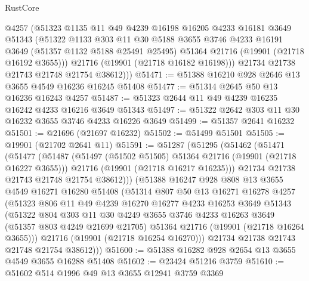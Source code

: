 \begin{lexlean}{RustCore}
\begin{coremodule}
          @4257
          (@51323
            @1135
            @11
            @49
            @4239
            @16198
            @16205
            @4233
            @16181
            @3649
            @51343
            (@51322
              @1133
              @303
              @11
              @30
              @5188
              @3655
              @3746
              @4233
              @16191
              @3649
              (@51357 @1132 @5188 @25491 @25495)
              @51364
              @21716
              (@19901 (@21718 @16192 @3655)))
            @21716
            (@19901 (@21718 @16182 @16198)))
          @21734
          @21738
          @21743
          @21748
          @21754
          @38612)))
@51471 := @51388 @16210 @928 @2646 @13 @3655 @4549 @16236 @16245 @51408
@51477 := @51314 @2645 @50 @13 @16236 @16243 @4257
@51487 := @51323 @2644 @11 @49 @4239 @16235 @16242 @4233 @16216 @3649 @51343
@51497 := @51322 @2642 @303 @11 @30 @16232 @3655 @3746 @4233 @16226 @3649
@51499 := @51357 @2641 @16232
@51501 := @21696 (@21697 @16232)
@51502 := @51499 @51501
@51505 := @19901 (@21702 @2641 @11)
@51591 := @51287
    (@51295
      (@51462
        (@51471
          (@51477
            (@51487
              (@51497 (@51502 @51505) @51364 @21716 (@19901 (@21718 @16227 @3655)))
              @21716
              (@19901 (@21718 @16217 @16235)))
            @21734
            @21738
            @21743
            @21748
            @21754
            @38612)))
      (@51388
        @16247
        @928
        @808
        @13
        @3655
        @4549
        @16271
        @16280
        @51408
        (@51314
          @807
          @50
          @13
          @16271
          @16278
          @4257
          (@51323
            @806
            @11
            @49
            @4239
            @16270
            @16277
            @4233
            @16253
            @3649
            @51343
            (@51322
              @804
              @303
              @11
              @30
              @4249
              @3655
              @3746
              @4233
              @16263
              @3649
              (@51357 @803 @4249 @21699 @21705)
              @51364
              @21716
              (@19901 (@21718 @16264 @3655)))
            @21716
            (@19901 (@21718 @16254 @16270)))
          @21734
          @21738
          @21743
          @21748
          @21754
          @38612)))
@51600 := @51388 @16282 @928 @2654 @13 @3655 @4549 @3655 @16288 @51408
@51602 := @23424 @51216 @3759
@51610 := @51602 @514 @1996 @49 @13 @3655 @12941 @3759 @3369

\end{coremodule}
\end{lexlean}
